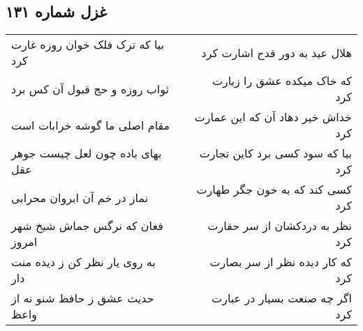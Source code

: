 \begin{center}
\section*{غزل شماره ۱۳۱}
\label{sec:sh131}
\begin{longtable}{l p{0.5cm} r}
بیا که ترک فلک خوان روزه غارت کرد
&&
هلال عید به دور قدح اشارت کرد
\\
ثواب روزه و حج قبول آن کس برد
&&
که خاک میکده عشق را زیارت کرد
\\
مقام اصلی ما گوشه خرابات است
&&
خداش خیر دهاد آن که این عمارت کرد
\\
بهای باده چون لعل چیست جوهر عقل
&&
بیا که سود کسی برد کاین تجارت کرد
\\
نماز در خم آن ابروان محرابی
&&
کسی کند که به خون جگر طهارت کرد
\\
فغان که نرگس جماش شیخ شهر امروز
&&
نظر به دردکشان از سر حقارت کرد
\\
به روی یار نظر کن ز دیده منت دار
&&
که کار دیده نظر از سر بصارت کرد
\\
حدیث عشق ز حافظ شنو نه از واعظ
&&
اگر چه صنعت بسیار در عبارت کرد
\\
\end{longtable}
\end{center}
